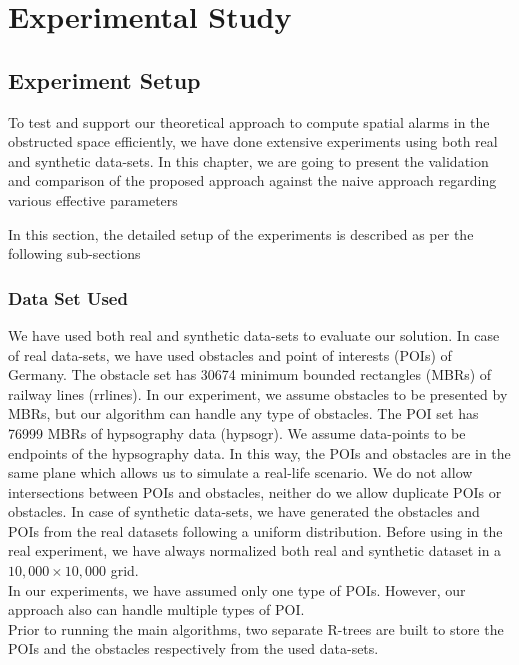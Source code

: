 \chapter{Experimental Study}
\section{\label{sec:exp}Experiment Setup}

To test and support our theoretical approach to compute spatial alarms in the obstructed space efficiently, we have done extensive experiments using both real and synthetic data-sets. In this chapter, we are going to present the validation and comparison of the proposed approach against the naive approach regarding various effective parameters

In this section, the detailed setup of the experiments is described as per the following sub-sections
\subsection{Data Set Used}

We have used both real and synthetic data-sets to evaluate our solution. In case of real data-sets, we have used obstacles and point of interests (POIs) of Germany. The obstacle set has 30674 minimum bounded rectangles (MBRs) of railway lines (rrlines). In our experiment, we assume obstacles to be presented by MBRs, but our algorithm can handle any type of obstacles. The POI set has 76999 MBRs of hypsography data (hypsogr). We assume data-points to be endpoints of the hypsography data. In this way, the POIs and obstacles are in the same plane which allows us to simulate a real-life scenario. We do not allow intersections between POIs and obstacles, neither do we allow duplicate POIs or obstacles. In case of synthetic data-sets, we have generated the obstacles and POIs from the real datasets following a uniform distribution. Before using in the real experiment, we have always normalized both real and synthetic dataset in a $  10,000 \times 10,000 $ grid.\\
In our experiments, we have assumed only one type of POIs. However, our approach also can handle multiple types of POI. \\
Prior to  running the main algorithms, two separate R-trees are built to store the POIs and the obstacles respectively from the used data-sets.\\





